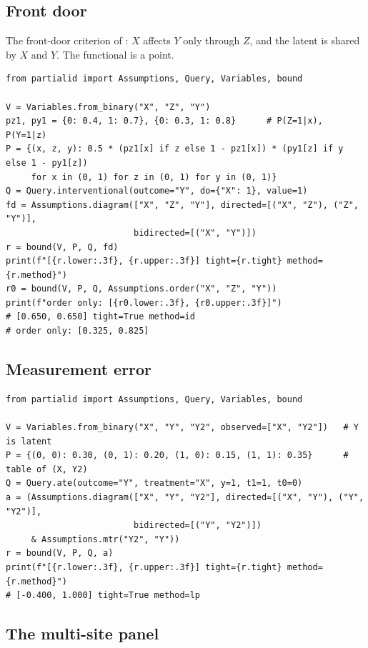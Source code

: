 \subsection{Front door}
\label{app:code-fd}

The front-door criterion of \citet{pearl1995diagrams}: $X$ affects $Y$ only
through $Z$, and the latent is shared by $X$ and $Y$. The functional is a point.
\begin{lstlisting}
from partialid import Assumptions, Query, Variables, bound

V = Variables.from_binary("X", "Z", "Y")
pz1, py1 = {0: 0.4, 1: 0.7}, {0: 0.3, 1: 0.8}      # P(Z=1|x), P(Y=1|z)
P = {(x, z, y): 0.5 * (pz1[x] if z else 1 - pz1[x]) * (py1[z] if y else 1 - py1[z])
     for x in (0, 1) for z in (0, 1) for y in (0, 1)}
Q = Query.interventional(outcome="Y", do={"X": 1}, value=1)
fd = Assumptions.diagram(["X", "Z", "Y"], directed=[("X", "Z"), ("Z", "Y")],
                         bidirected=[("X", "Y")])
r = bound(V, P, Q, fd)
print(f"[{r.lower:.3f}, {r.upper:.3f}] tight={r.tight} method={r.method}")
r0 = bound(V, P, Q, Assumptions.order("X", "Z", "Y"))
print(f"order only: [{r0.lower:.3f}, {r0.upper:.3f}]")
# [0.650, 0.650] tight=True method=id
# order only: [0.325, 0.825]
\end{lstlisting}

\subsection{Measurement error}
\label{app:code-me}

\begin{lstlisting}
from partialid import Assumptions, Query, Variables, bound

V = Variables.from_binary("X", "Y", "Y2", observed=["X", "Y2"])   # Y is latent
P = {(0, 0): 0.30, (0, 1): 0.20, (1, 0): 0.15, (1, 1): 0.35}      # table of (X, Y2)
Q = Query.ate(outcome="Y", treatment="X", y=1, t1=1, t0=0)
a = (Assumptions.diagram(["X", "Y", "Y2"], directed=[("X", "Y"), ("Y", "Y2")],
                         bidirected=[("Y", "Y2")])
     & Assumptions.mtr("Y2", "Y"))
r = bound(V, P, Q, a)
print(f"[{r.lower:.3f}, {r.upper:.3f}] tight={r.tight} method={r.method}")
# [-0.400, 1.000] tight=True method=lp
\end{lstlisting}

\subsection{The multi-site panel}
\label{app:code-panel}

